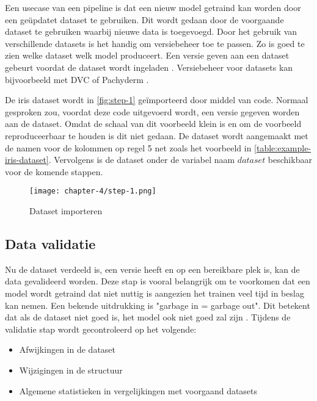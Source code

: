 Een usecase van een pipeline is dat een nieuw model getraind kan worden door een geüpdatet dataset te gebruiken. Dit wordt gedaan door de voorgaande dataset te gebruiken waarbij nieuwe data is toegevoegd. Door het gebruik van verschillende datasets is het handig om versiebeheer toe te passen. Zo is goed te zien welke dataset welk model produceert. Een versie geven aan een dataset gebeurt voordat de dataset wordt ingeladen \cite[p.~39-40]{building-machine-learning-pipelines-oreilly}. Versiebeheer voor datasets kan bijvoorbeeld met DVC \cite{dvc} of Pachyderm \cite{pachyderm}.

De iris dataset wordt in \autoref{fig:step-1} geïmporteerd door middel van code. Normaal gesproken zou, voordat deze code uitgevoerd wordt, een versie gegeven worden aan de dataset. Omdat de schaal van dit voorbeeld klein is en om de voorbeeld reproduceerbaar te houden is dit niet gedaan. De dataset wordt aangemaakt met de namen voor de kolommen op regel 5 net zoals het voorbeeld in \autoref{table:example-iris-dataset}. Vervolgens is de dataset onder de variabel naam \(dataset\) beschikbaar voor de komende stappen.

\begin{figure}[hbt!]
  \centering
  \texttt{[image: chapter-4/step-1.png]}
  \caption{Dataset importeren}
  \label{fig:step-1}
\end{figure}

\subsection{Data validatie}\label{subsec:data-validatie}
Nu de dataset verdeeld is, een versie heeft en op een bereikbare plek is, kan de data gevalideerd worden. Deze stap is vooral belangrijk om te voorkomen dat een model wordt getraind dat niet nuttig is aangezien het trainen veel tijd in beslag kan nemen. Een bekende uitdrukking is "garbage in = garbage out". Dit betekent dat als de dataset niet goed is, het model ook niet goed zal zijn \cite[p.~43]{building-machine-learning-pipelines-oreilly}. Tijdens de validatie stap wordt gecontroleerd op het volgende:

\begin{itemize}
  \item Afwijkingen in de dataset
  \item Wijzigingen in de structuur
  \item Algemene statistieken in vergelijkingen met voorgaand datasets \cite[p.~44]{building-machine-learning-pipelines-oreilly}
\end{itemize}

